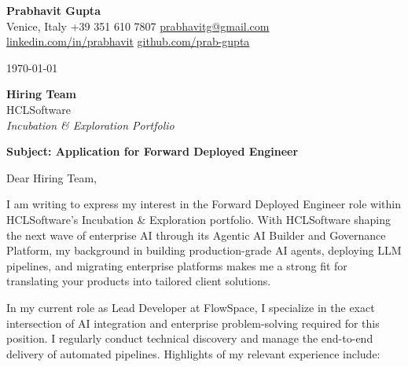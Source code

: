 \documentclass[11pt,a4paper]{article}
\begin{document}
\pagestyle{empty}

\begin{center}
    {\huge \textbf{Prabhavit Gupta}} \\ \vspace{5pt}
    Venice, Italy \textbar{} +39 351 610 7807 \textbar{} \href{mailto:prabhavitg@gmail.com}{prabhavitg@gmail.com} \\
    \href{https://www.linkedin.com/in/prabhavit}{linkedin.com/in/prabhavit} \textbar{} \href{https://github.com/prab-gupta}{github.com/prab-gupta}
\end{center}

\vspace{20pt}

\noindent \today

\vspace{10pt}

\noindent \textbf{Hiring Team} \\
HCLSoftware \\
\textit{Incubation \& Exploration Portfolio}

\vspace{15pt}

\noindent \textbf{Subject: Application for Forward Deployed Engineer}

\vspace{15pt}

\noindent Dear Hiring Team,

\vspace{10pt}

\noindent I am writing to express my interest in the Forward Deployed Engineer role within HCLSoftware's Incubation \& Exploration portfolio. With HCLSoftware shaping the next wave of enterprise AI through its Agentic AI Builder and Governance Platform, my background in building production-grade AI agents, deploying LLM pipelines, and migrating enterprise platforms makes me a strong fit for translating your products into tailored client solutions.

\vspace{10pt}

\noindent In my current role as Lead Developer at FlowSpace, I specialize in the exact intersection of AI integration and enterprise problem-solving required for this position. I regularly conduct technical discovery and manage the end-to-end delivery of automated pipelines. Highlights of my relevant experience include:
\end{document}
